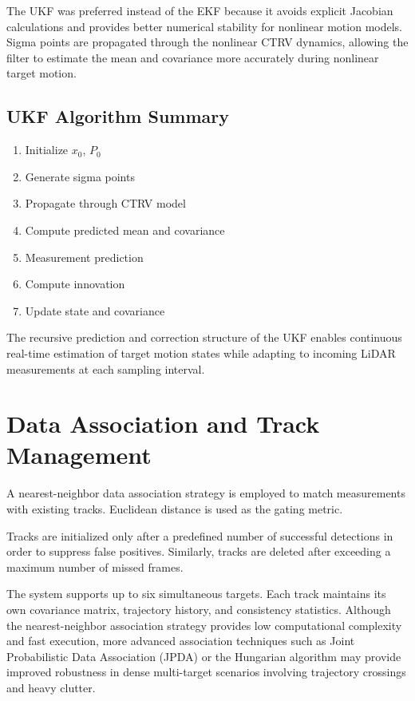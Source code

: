 \documentclass[conference]{IEEEtran}
\begin{document}
The UKF was preferred instead of the EKF because it avoids explicit Jacobian calculations and provides better numerical stability for nonlinear motion models. Sigma points are propagated through the nonlinear CTRV dynamics, allowing the filter to estimate the mean and covariance more accurately during nonlinear target motion.

\subsection{UKF Algorithm Summary}
\begin{enumerate}
    \item Initialize $x_{0}$, $P_{0}$
    \item Generate sigma points
    \item Propagate through CTRV model
    \item Compute predicted mean and covariance
    \item Measurement prediction
    \item Compute innovation
    \item Update state and covariance
\end{enumerate}
The recursive prediction and correction structure of the UKF enables continuous real-time estimation of target motion states while adapting to incoming LiDAR measurements at each sampling interval.

\section{Data Association and Track Management}
A nearest-neighbor data association strategy is employed to match measurements with existing tracks. Euclidean distance is used as the gating metric.

Tracks are initialized only after a predefined number of successful detections in order to suppress false positives. Similarly, tracks are deleted after exceeding a maximum number of missed frames.

The system supports up to six simultaneous targets. Each track maintains its own covariance matrix, trajectory history, and consistency statistics. Although the nearest-neighbor association strategy provides low computational complexity and fast execution, more advanced association techniques such as Joint Probabilistic Data Association (JPDA) or the Hungarian algorithm may provide improved robustness in dense multi-target scenarios involving trajectory crossings and heavy clutter.
\end{document}
